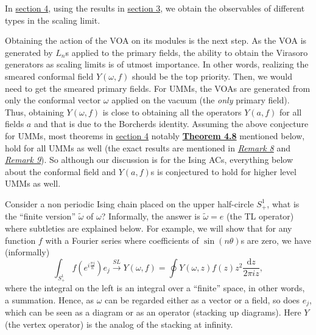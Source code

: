 \documentclass[twoside,11pt,titlepage]{amsart}
\renewcommand{\=}[1]{\stackrel{#1}{=}} %
\theoremstyle{definition}
\theoremstyle{remark}
\begin{document}
In \hyperref[4]{section 4}, using the results in \hyperref[3]{section 3}, we obtain the observables of different types in the scaling limit. 

Obtaining the action of the VOA on its modules is the next step. As the VOA is generated by $L_n$s applied to the primary fields, the ability to obtain the Virasoro generators as scaling limits is of utmost importance. In other words, realizing the smeared conformal field $Y(\omega,f)$ should be the top priority. Then, we would need to get the smeared primary fields. For UMMs, the VOAs are generated from only the conformal vector $\omega$ applied on the vacuum (the \textit{only} primary field). Thus, obtaining $Y(\omega,f)$ is close to obtaining all the operators $Y(a,f)$ for all fields $a$ and that is due to the Borcherds identity. Assuming the above conjecture for UMMs, most theorems in \hyperref[4]{section 4} notably \hyperref[thm4.8]{\textbf{Theorem 4.8}} mentioned below, hold for all UMMs as well (the exact results are mentioned in \hyperref[rmk8]{\textit{Remark 8}} and \hyperref[rmk9]{\textit{Remark 9}}). So although our discussion is for the Ising ACs, everything below about the conformal field and $Y(a,f)$s is conjectured to hold for higher level UMMs as well.

Consider a non periodic Ising chain placed on the upper half-circle $S^1_+$, what is the ``finite version'' $\widetilde{\omega}$ of $\omega$? Informally, the answer is $\widetilde{\omega}=e$ (the TL operator) where subtleties are explained below. For example, we will show that for any function $f$ with a Fourier series where coefficients of $\sin(n\theta)$s are zero, we have (informally)
$$\int_{S^1_+} f(e^{i\frac{\pi j}{n}})e_j \xrightarrow{SL} Y(\omega,f)=\oint Y(\omega,z)f(z)z^2 \frac{\text{d}z}{2\pi i z},$$
where the integral on the left is an integral over a ``finite'' space, in other words, a summation. Hence, as $\omega$ can be regarded either as a vector or a field, so does $e_j$, which can be seen as a diagram or as an operator (stacking up diagrams). Here $Y$ (the vertex operator) is the analog of the stacking at infinity.
\end{document}

